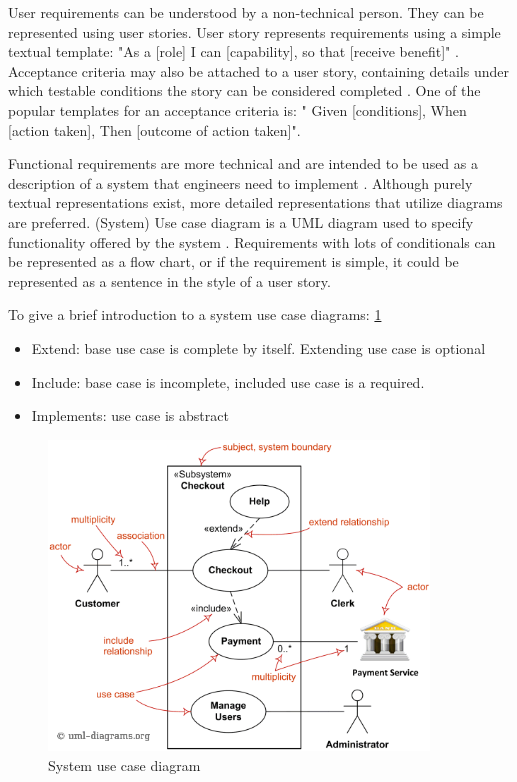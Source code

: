 User requirements can be understood by a non-technical person. They can be represented using user stories. User story represents requirements using a simple textual template: "As a [role] I can [capability], so that [receive benefit]" \cite{userStories}. Acceptance criteria may also be attached to a user story, containing details under which testable conditions the story can be considered completed \cite{Kannan2019User}. One of the popular templates for an acceptance criteria is: " Given [conditions], When [action taken], Then [outcome of action taken]". 

Functional requirements are more technical and are intended to be used as a description of a system that engineers need to implement \cite{wiegers2013software}. Although purely textual representations exist, more detailed representations that utilize diagrams are preferred. (System) Use case diagram is a UML diagram used to specify functionality offered by the system \cite{malan2001functional}. Requirements with lots of conditionals can be represented as a flow chart, or if the requirement is simple, it could be represented as a sentence in the style of a user story. 

To give a brief introduction to a system use case diagrams: \ref{fig:useCase}
\begin{itemize}
    \item Extend: base use case is complete by itself. Extending use case is optional
    \item Include: base case is incomplete, included use case is a required.
    \item Implements: use case is abstract
\end{itemize}
\begin{figure}
    
    \centering
    \includegraphics[width=0.9\textwidth,keepaspectratio]{../images/use-case-diagram-elements.png}
    \caption{System use case diagram}
    \label{fig:useCase}
\end{figure}

